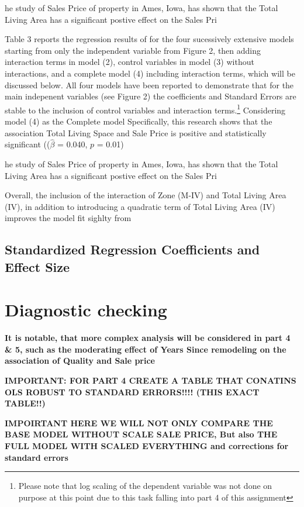 \documentclass[a4paper]{article}
\begin{document}
he study of Sales Price of property in Ames, Iowa, has shown that the Total Living Area has a significant postive effect on the Sales Pri


Table 3 reports the regression results of  for the four sucessively extensive models starting from only the independent variable from Figure 2, then adding interaction terms in model (2), control variables in model (3) without interactions, and a complete model (4) including interaction terms, which will be discussed below. All four models have been reported to demonstrate that for the main indepenent variables (see Figure 2) the coefficients and Standard Errors are stable to the inclusion of control variables and interaction terms.\footnote{Please note that log scaling of the dependent variable was not done on purpose at this point due to this task falling into part 4 of this assignment}
Considering model (4) as the Complete model
Specifically, this research shows that the association Total Living Space and Sale Price is positive and  statistically significant (($\hat{\beta}$ = 0.040, $p$ = 0.01)


he study of Sales Price of property in Ames, Iowa, has shown that the Total Living Area has a significant postive effect on the Sales Pri

Overall, the inclusion of the interaction of Zone (M-IV) and Total Living Area (IV), in addition to introducing a quadratic term of Total Living Area (IV) improves the model fit sighlty from 


\subsection{Standardized Regression Coefficients and Effect Size}










\section{Diagnostic checking}
\textbf{It is notable, that more complex analysis will be considered in part 4 \& 5, such as the moderating effect of Years Since remodeling on the association of Quality and Sale price}

\textbf{IMPORTANT: FOR PART 4 CREATE A TABLE THAT CONATINS OLS ROBUST TO STANDARD ERRORS!!!! (THIS EXACT TABLE!!)}

\textbf{IMPOIRTANT HERE WE WILL NOT ONLY COMPARE THE BASE MODEL WITHOUT SCALE SALE PRICE, But also THE FULL MODEL WITH SCALED EVERYTHING and corrections for standard errors }
\end{document}
